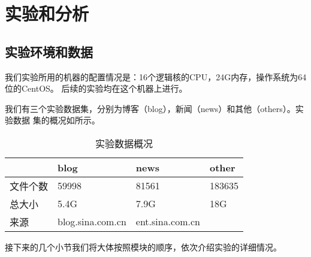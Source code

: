 \section{实验和分析}
\label{sec:result-analysis}

\subsection{实验环境和数据}
\label{sec:dataenv}
我们实验所用的机器的配置情况是：16个逻辑核的CPU，24G内存，操作系统为64位的CentOS。
后续的实验均在这个机器上进行。

我们有三个实验数据集，分别为博客（blog），新闻（news）和其他（others）。实验数据
集的概况如所示。%
\begin{table}[h]
  \centering
\begin{tabular}{llll}
\toprule
 & blog & news & other \\
\hline
文件个数 & 59998 & 81561 & 183635 \\
总大小 & 5.4G & 7.9G & 18G \\
来源 & blog.sina.com.cn &  ent.sina.com.cn &  \\
\bottomrule
\end{tabular}
  \caption{实验数据概况}
  \label{experiment:tab:overview}
\end{table}
\begin{comment}
#+ORGTBL: SEND 实验数据概况 orgtbl-to-latex :splice nil :skip 0
|          | blog             | news            | other  |
|----------+------------------+-----------------+--------|
| 文件个数 | 59998            | 81561           | 183635 |
| 总大小   | 5.4G             | 7.9G            | 18G    |
| 来源     | blog.sina.com.cn | ent.sina.com.cn |        |
\end{comment}

接下来的几个小节我们将大体按照模块的顺序，依次介绍实验的详细情况。
\label{sec:results}
